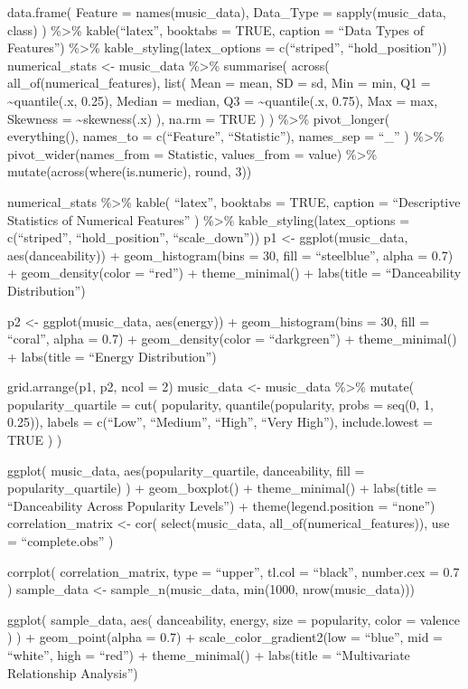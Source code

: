 \documentclass[
]{article}
\begin{document}
data.frame( Feature = names(music\_data), Data\_Type =
sapply(music\_data, class) ) \%\textgreater\% kable(``latex'', booktabs
= TRUE, caption = ``Data Types of Features'') \%\textgreater\%
kable\_styling(latex\_options = c(``striped'', ``hold\_position''))
numerical\_stats \textless- music\_data \%\textgreater\% summarise(
across( all\_of(numerical\_features), list( Mean = mean, SD = sd, Min =
min, Q1 = \textasciitilde quantile(.x, 0.25), Median = median, Q3 =
\textasciitilde quantile(.x, 0.75), Max = max, Skewness =
\textasciitilde skewness(.x) ), na.rm = TRUE ) ) \%\textgreater\%
pivot\_longer( everything(), names\_to = c(``Feature'', ``Statistic''),
names\_sep = ``\_'' ) \%\textgreater\% pivot\_wider(names\_from =
Statistic, values\_from = value) \%\textgreater\%
mutate(across(where(is.numeric), round, 3))

numerical\_stats \%\textgreater\% kable( ``latex'', booktabs = TRUE,
caption = ``Descriptive Statistics of Numerical Features'' )
\%\textgreater\% kable\_styling(latex\_options = c(``striped'',
``hold\_position'', ``scale\_down'')) p1 \textless- ggplot(music\_data,
aes(danceability)) + geom\_histogram(bins = 30, fill = ``steelblue'',
alpha = 0.7) + geom\_density(color = ``red'') + theme\_minimal() +
labs(title = ``Danceability Distribution'')

p2 \textless- ggplot(music\_data, aes(energy)) + geom\_histogram(bins =
30, fill = ``coral'', alpha = 0.7) + geom\_density(color =
``darkgreen'') + theme\_minimal() + labs(title = ``Energy
Distribution'')

grid.arrange(p1, p2, ncol = 2) music\_data \textless- music\_data
\%\textgreater\% mutate( popularity\_quartile = cut( popularity,
quantile(popularity, probs = seq(0, 1, 0.25)), labels = c(``Low'',
``Medium'', ``High'', ``Very High''), include.lowest = TRUE ) )

ggplot( music\_data, aes(popularity\_quartile, danceability, fill =
popularity\_quartile) ) + geom\_boxplot() + theme\_minimal() +
labs(title = ``Danceability Across Popularity Levels'') +
theme(legend.position = ``none'') correlation\_matrix \textless- cor(
select(music\_data, all\_of(numerical\_features)), use =
``complete.obs'' )

corrplot( correlation\_matrix, type = ``upper'', tl.col = ``black'',
number.cex = 0.7 ) sample\_data \textless- sample\_n(music\_data,
min(1000, nrow(music\_data)))

ggplot( sample\_data, aes( danceability, energy, size = popularity,
color = valence ) ) + geom\_point(alpha = 0.7) +
scale\_color\_gradient2(low = ``blue'', mid = ``white'', high = ``red'')
+ theme\_minimal() + labs(title = ``Multivariate Relationship
Analysis'')
\end{document}
